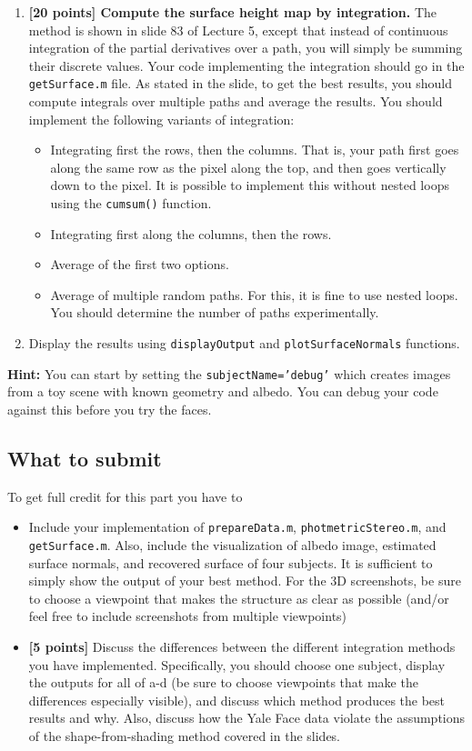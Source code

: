 \documentclass[10pt,letterpaper]{article}
\newcommand{\cmd}[1] {{\color{blue}\texttt{#1}}}
\begin{document}
\begin{enumerate}
\item \textbf{[20 points] Compute the surface height map by integration.} The method is shown in slide 83 of Lecture 5, except that instead of continuous integration of the partial derivatives over a path, you will simply be summing their discrete values. Your code implementing the integration should go in the \cmd{getSurface.m} file. As stated in the slide, to get the best results, you should compute integrals over multiple paths and average the results. You should implement the following variants of integration: 
\begin{itemize}
\item Integrating first the rows, then the columns. That is, your path first goes along the same row as the pixel along the top, and then goes vertically down to the pixel. It is possible to implement this without nested loops using the \cmd{cumsum()} function.
\item Integrating first along the columns, then the rows.
\item Average of the first two options.
\item Average of multiple random paths. For this, it is fine to use nested loops. You should determine the number of paths experimentally.
\end{itemize}

\item Display the results using \cmd{displayOutput} and \cmd{plotSurfaceNormals} functions.

\end{enumerate}

\textbf{Hint:} You can start by setting the \cmd{subjectName='debug'} which creates images from a toy scene with known geometry and albedo. You can debug your code against this before you try the faces.

\subsection{What to submit}
To get full credit for this part you have to
\begin{itemize}
\item Include your implementation of \cmd{prepareData.m}, \cmd{photmetricStereo.m}, and \cmd{getSurface.m}. Also, include the visualization of albedo image, estimated surface normals, and recovered surface of four subjects. It is sufficient to simply show the output of your best method. For the 3D screenshots, be sure to choose a viewpoint that makes the structure as clear as possible (and/or feel free to include screenshots from multiple viewpoints)
\item \textbf{[5 points]} Discuss the differences between the different integration methods you have implemented. Specifically, you should choose one subject, display the outputs for all of a-d (be sure to choose viewpoints that make the differences especially visible), and discuss which method produces the best results and why. Also, discuss how the Yale Face data violate the assumptions of the shape-from-shading method covered in the slides.
\end{itemize}
\end{document}

